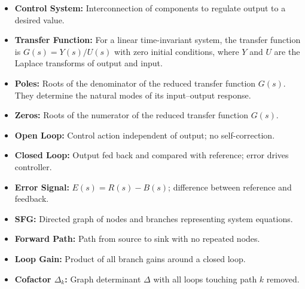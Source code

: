 \documentclass[12pt,a4paper]{article}
\begin{document}
\vspace{6pt}

\begin{tcolorbox}[defbox, title={\textbf{One-Line Definitions}}]
\begin{itemize}[leftmargin=*, itemsep=3pt, topsep=0pt]
  \item \textbf{Control System:} Interconnection of components to regulate output to a desired value.
  \item \textbf{Transfer Function:} For a linear time-invariant system, the transfer function is $G(s)=Y(s)/U(s)$ with zero initial conditions, where $Y$ and $U$ are the Laplace transforms of output and input.
  \item \textbf{Poles:} Roots of the denominator of the reduced transfer function $G(s)$. They determine the natural modes of its input--output response.
  \item \textbf{Zeros:} Roots of the numerator of the reduced transfer function $G(s)$.
  \item \textbf{Open Loop:} Control action independent of output; no self-correction.
  \item \textbf{Closed Loop:} Output fed back and compared with reference; error drives controller.
  \item \textbf{Error Signal:} $E(s) = R(s) - B(s)$; difference between reference and feedback.
  \item \textbf{SFG:} Directed graph of nodes and branches representing system equations.
  \item \textbf{Forward Path:} Path from source to sink with no repeated nodes.
  \item \textbf{Loop Gain:} Product of all branch gains around a closed loop.
  \item \textbf{Cofactor $\Delta_k$:} Graph determinant $\Delta$ with all loops touching path $k$ removed.
\end{itemize}
\end{tcolorbox}

\vspace{6pt}
\end{document}
